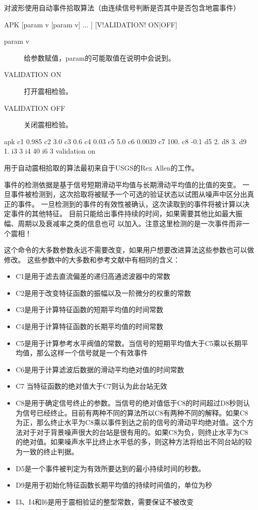 \label{cmd:apk}

对波形使用自动事件拾取算法（由连续信号判断是否其中是否包含地震事件）

\begin{SACSTX}
APK [param v [param v] ... ] [V!ALIDATION! ON|OFF]
\end{SACSTX}

\begin{description}
\item [param v] 给参数赋值，param的可能取值在说明中会说到。
\item [VALIDATION ON] 打开震相检验。
\item [VALIDATION OFF] 关闭震相检验。
\end{description}

\begin{SACDFT}
apk c1 0.985 c2 3.0 c3 0.6 c4 0.03 c5 5.0 c6 0.0039 c7 100. c8 -0.1 
    d5 2. d8 3. d9 1. i3 3 i4 40 i6 3 validation on
\end{SACDFT}

用于自动震相拾取的算法最初来自于USGS的Rex Allen的工作。

事件的检测依据是基于信号短期滑动平均值与长期滑动平均值的比值的突变。
一旦事件被检测到，这次拾取将被赋予一个可选的验证状态以试图从噪声中区分出真正的事件。
一旦检测到的事件的有效性被确认，这次读取到的事件将被计算以决定事件的其他特征。
目前只能给出事件持续的时间，如果需要其他比如最大振幅、周期以及衰减率之类的信息也可
以加入。注意这里检测的是一次事件而非一个震相！

这个命令的大多数参数永远不需要改变，如果用户想要改进算法这些参数也可以做修改。
这些参数中的大多数和参考文献中有相同的含义：
\begin{itemize}
\item C1是用于滤去直流偏差的递归高通滤波器中的常数
\item C2是用于改变特征函数的振幅以及一阶微分的权重的常数
\item C3是用于计算特征函数的短期平均值的时间常数
\item C4是用于计算特征函数的长期平均值的时间常数
\item C5是用于计算参考水平阀值的常数。当信号的短期平均值大于C5乘以长期平均值，那么这样一个信号就是一个有效事件
\item C6是用于计算滤波后数据的滑动平均绝对值的时间常数
\item C7 当特征函数的绝对值大于C7则认为此台站无效
\item C8是用于确定信号终止的参数。当信号的绝对值低于C8的时间超过D8秒则认为信号已经终止。目前有两种不同的算法所以C8有两种不同的解释。如果C8为正，那么终止水平为C8乘以事件到达之前的信号的滑动平均绝对值。这个方法对于对于背景噪声很大的台站是很有用的。如果C8为负，则终止水平为C8的绝对值。如果噪声水平比终止水平低的多，则这种方法将给出不同台站的较为一致的终止判据。
\item D5是一个事件被判定为有效所要达到的最小持续时间的秒数。
\item D9是用于初始化特征函数长期平均值的持续时间值的，单位为秒
\item I3、I4和I6是用于震相验证的整型常数，需要保证不被改变
\end{itemize}

